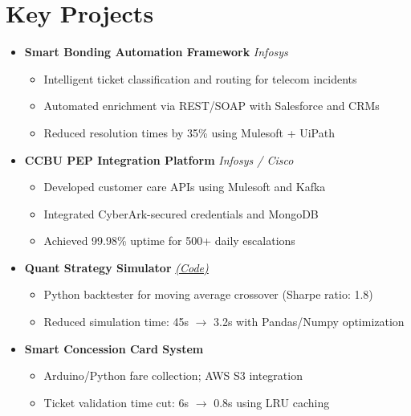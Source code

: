 \documentclass[letterpaper,11pt]{article}
\begin{document}
\section*{Key Projects}\vspace{6pt}
\begin{itemize}
    \item \textbf{Smart Bonding Automation Framework} \hfill \textit{Infosys}
    \begin{itemize}
        \item Intelligent ticket classification and routing for telecom incidents
        \item Automated enrichment via REST/SOAP with Salesforce and CRMs
        \item Reduced resolution times by 35\% using Mulesoft + UiPath\\
    \end{itemize}

    \item \textbf{CCBU PEP Integration Platform} \hfill \textit{Infosys / Cisco}
    \begin{itemize}
        \item Developed customer care APIs using Mulesoft and Kafka
        \item Integrated CyberArk-secured credentials and MongoDB
        \item Achieved 99.98\% uptime for 500+ daily escalations
    \end{itemize}

    \item \textbf{Quant Strategy Simulator} \hfill \textit{\href{https://github.com/vishnuvrithan}{(Code)}}
    \begin{itemize}
        \item Python backtester for moving average crossover (Sharpe ratio: 1.8)
        \item Reduced simulation time: 45s $\rightarrow$ 3.2s with Pandas/Numpy optimization
    \end{itemize}

    \item \textbf{Smart Concession Card System}
    \begin{itemize}
        \item Arduino/Python fare collection; AWS S3 integration
        \item Ticket validation time cut: 6s $\rightarrow$ 0.8s using LRU caching
    \end{itemize}
\end{itemize}
\end{document}
